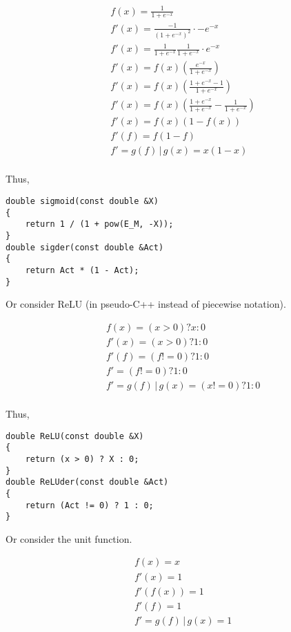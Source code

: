 \documentclass[8pt]{amsart}
\newcommand\where{\, \bigg \rvert \,}
\begin{document}
\[
    \begin{aligned}
        & f(x) = \frac{1}{1 + e^{-x}} \\
        & f'(x) = \frac{-1}{(1 + e^{-x})^2} \cdot -e^{-x} \\
        & f'(x) = \frac{1}{1 + e^{-x}} \frac{1}{1 + e^{-x}} \cdot e^{-x} \\
        & f'(x) = f(x) \left( \frac{e^{-x}}{1 + e^{-x}} \right) \\
        & f'(x) = f(x) \left( \frac{1 + e^{-x} - 1}{1 + e^{-x}} \right) \\
        & f'(x) = f(x) \left( \frac{1 + e^{-x}}{1 + e^{-x}} - \frac{1}{1 + e^{-x}} \right) \\
        & f'(x) = f(x) (1 - f(x)) \\
        & f'(f) = f (1 - f) \\
        & f' = g(f) \where g(x) = x (1 - x) \\
    \end{aligned}
\]

Thus,

\begin{verbatim}
double sigmoid(const double &X)
{
    return 1 / (1 + pow(E_M, -X));
}
double sigder(const double &Act)
{
    return Act * (1 - Act);
}
\end{verbatim}

Or consider ReLU (in pseudo-C++ instead of piecewise notation).

\[
    \begin{aligned}
        & f(x) = (x > 0) ? x : 0 \\
        & f'(x) = (x > 0) ? 1 : 0 \\
        & f'(f) = (f != 0) ? 1 : 0 \\
        & f' = (f != 0) ? 1 : 0 \\
        & f' = g(f) \where g(x) = (x != 0) ? 1 : 0 \\
    \end{aligned}
\]

Thus,

\begin{verbatim}
double ReLU(const double &X)
{
    return (x > 0) ? X : 0;
}
double ReLUder(const double &Act)
{
    return (Act != 0) ? 1 : 0;
}
\end{verbatim}

Or consider the unit function.

\[
    \begin{aligned}
        & f(x) = x \\
        & f'(x) = 1 \\
        & f'(f(x)) = 1 \\
        & f'(f) = 1 \\
        & f' = g(f) \where g(x) = 1 \\
    \end{aligned}
\]
\end{document}
